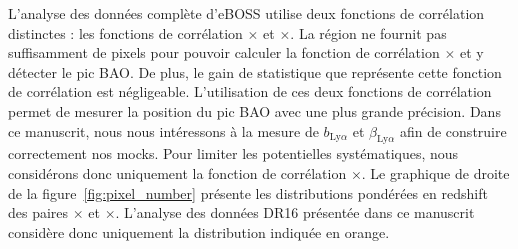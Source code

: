 L'analyse \lya{} des données complète d'eBOSS \autocite{DuMasdesBourboux2020} utilise deux fonctions de corrélation distinctes : les fonctions de corrélation \lyalya{}$\times$\lyalya{} et \lyalya{}$\times$\lyalyb{}.
La région \lyb{} ne fournit pas suffisamment de pixels pour pouvoir calculer la fonction de corrélation \lyalyb{}$\times$\lyalyb{} et y détecter le pic BAO. De plus, le gain de statistique que représente cette fonction de corrélation est négligeable.
L'utilisation de ces deux fonctions de corrélation permet de mesurer la position du pic BAO avec une plus grande précision. Dans ce manuscrit, nous nous intéressons à la mesure de $b_{\mathrm{Ly}\alpha}$ et $\beta_{\mathrm{Ly}\alpha}$ afin de construire correctement nos mocks. Pour limiter les potentielles systématiques, nous considérons donc uniquement la fonction de corrélation \lyalya{}$\times$\lyalya{}.
Le graphique de droite de la figure~\ref{fig:pixel_number} présente les distributions pondérées en redshift des paires \lyalya{}$\times$\lyalya{} et \lyalya{}$\times$\lyalyb{}. L'analyse des données DR16 présentée dans ce manuscrit considère donc uniquement la distribution indiquée en orange.


